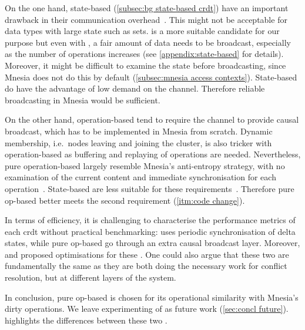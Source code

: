 On the one hand, state-based  (\cref{subsec:bg state-based crdt}) 
have an important drawback in their communication
overhead~\cite{almeida2018DeltaCRDT}. This might not be acceptable for data types 
with large state such as sets.  is a more suitable candidate for our 
purpose but even with , a fair amount
of data needs to be broadcast, especially as the number of operations increases
(see \cref{appendix:state-based} for details). Moreover, it might be difficult to 
examine the state before broadcasting, since Mnesia does not do this by 
default (\cref{subsec:mnesia access contexts}).
State-based  do have the advantage of low demand 
on the channel. Therefore reliable broadcasting in Mnesia would be sufficient.
 

On the other hand, operation-based  tend to require the channel
to provide causal broadcast, which has to be implemented in Mnesia from scratch.
Dynamic membership, i.e.\
nodes leaving and joining the cluster, is also tricker with operation-based
 as buffering and replaying of operations are needed. Nevertheless,
pure operation-based \acrshortpl{crdt} largely resemble Mnesia's anti-entropy strategy,
with no examination of the current content and immediate synchronisation
for each operation~\cite{mattsson2009impltxt}. 
State-based  are less suitable for these requirements~\cite{preguica2018CRDT}. 
Therefore pure op-based \acrshortpl{crdt} better meets the second 
requirement (\cref{itm:code change}).

In terms of efficiency, it is challenging to characterise the performance metrics
of each \acrshort{crdt} without practical benchmarking:
 uses periodic synchronisation of delta states, while
pure op-based \acrshortpl{crdt} go through an extra causal broadcast layer.
Moreover, \citet{almeida2018DeltaCRDT} and \citet{baquero2017PureOp}
proposed optimisations for these . One could
also argue that these two \acrshortpl{crdt} are fundamentally the same as they
are both doing the necessary work for conflict resolution, but at different
layers of the system.

In conclusion, pure op-based  is chosen for its operational
similarity with Mnesia's dirty operations. We leave experimenting of
\acrshortpl{dcrdt} as future work (\cref{sec:concl future}).
 highlights the differences between these 
two \acrshortpl{crdt}.

